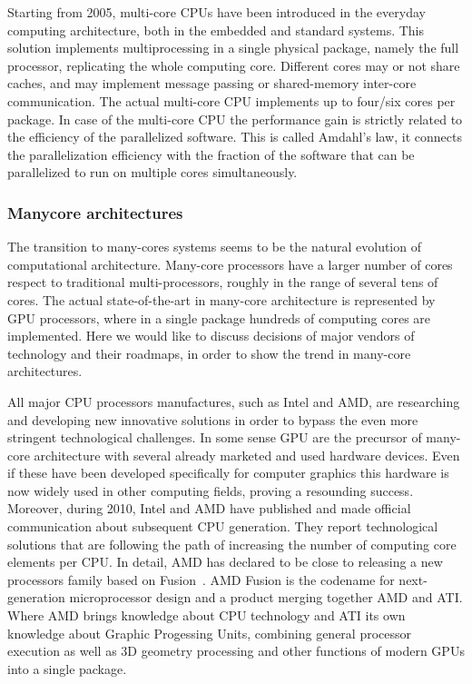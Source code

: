 Starting from 2005, multi-core CPUs have been introduced in the 
everyday computing architecture, both in the embedded and standard 
systems. This solution implements multiprocessing in a single physical 
package, namely the full processor, replicating the whole computing 
core. Different cores may or not share caches, and may implement 
message passing or shared-memory inter-core communication. The 
actual multi-core CPU implements up to four/six cores per package. 
In case of the multi-core CPU the performance gain is strictly 
related to the efficiency of the parallelized software. This is
called Amdahl's law\cite{Amdahl}, it connects the parallelization
efficiency with the fraction of the software that can be parallelized 
to run on multiple cores simultaneously.

\subsubsection{Manycore architectures}
\label{sec:manycore}
The transition to many-cores systems seems to be the natural evolution 
of computational architecture. Many-core processors have a larger 
number of cores respect to traditional multi-processors, roughly in 
the range of several tens of cores. The actual state-of-the-art 
in many-core architecture is represented by GPU processors, where in
a single package hundreds of computing cores are implemented.
Here we would like to discuss decisions of major vendors of technology and
their roadmaps, in order to show the trend in many-core architectures.

All major CPU processors manufactures, such as Intel and AMD, are 
researching and developing new innovative solutions in
order to  bypass the even more stringent technological challenges.
In some sense GPU  are the precursor of many-core architecture 
with several already marketed and used hardware devices. Even if 
these have been developed specifically for computer graphics this 
hardware is now widely used in other computing fields, proving a 
resounding success.  Moreover, during 2010, Intel and AMD have 
published and made official communication about subsequent CPU
generation. They report technological solutions that are following 
the path of increasing the number of computing core elements per CPU.
In detail, AMD has declared to be close to releasing a new processors 
family  based on Fusion~\cite{amdfusion}. AMD Fusion is the
codename for next-generation microprocessor design and a product 
merging together AMD and ATI. Where AMD brings knowledge about 
CPU technology and ATI its own knowledge about Graphic Progessing 
Units, combining general processor execution as well as 3D geometry 
processing and other functions of modern GPUs into a single package. 

